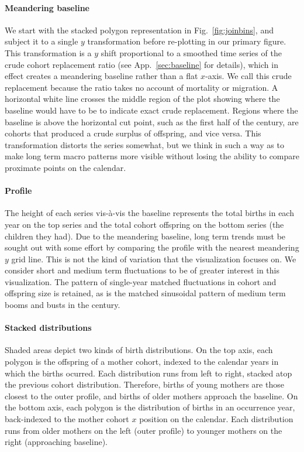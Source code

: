 \documentclass{article}
\begin{document}
\paragraph{Meandering baseline} We start with the stacked polygon representation in Fig.~\ref{fig:joinbins}, and subject it to a single $y$ transformation before re-plotting in our primary figure. This transformation is a $y$ shift proportional to a smoothed time series of the crude cohort replacement ratio (see App.~\ref{sec:baseline} for details), which in effect creates a meandering baseline rather than a flat $x$-axis. We call this crude replacement because the ratio takes no account of mortality or migration. A horizontal white line crosses the middle region of the plot showing where the baseline would have to be to indicate exact crude replacement. Regions where the baseline is above the horizontal cut point, such as the first half of the  century, are cohorts that produced a crude surplus of offspring, and vice versa. This transformation distorts the series somewhat, but we think in such a way as to make long term macro patterns more visible without losing the ability to compare proximate points on the calendar.

\paragraph{Profile} The height of each series vis-\`a-vis the baseline represents the total births in each year on the top series and the total cohort offspring on the bottom series (the children they had). Due to the meandering baseline, long term trends must be sought out with some effort by comparing the profile with the nearest meandering $y$ grid line. This is not the kind of variation that the visualization focuses on. We consider short and medium term fluctuations to be of greater interest in this visualization. The pattern of single-year matched fluctuations in cohort and offspring size is retained, as is the matched sinusoidal pattern of medium term booms and busts in the  century.

\paragraph{Stacked distributions} Shaded areas depict two kinds of birth distributions. On the top axis, each polygon is the offspring of a mother cohort, indexed to the calendar years in which the births ocurred. Each distribution runs from left to right, stacked atop the previous cohort distribution. Therefore, births of young mothers are those closest to the outer profile, and births of older mothers approach the baseline. On the bottom axis, each polygon is the distribution of births in an occurrence year, back-indexed to the mother cohort $x$ position on the calendar. Each distribution runs from older mothers on the left (outer profile) to younger mothers on the right (approaching baseline).
\end{document}
